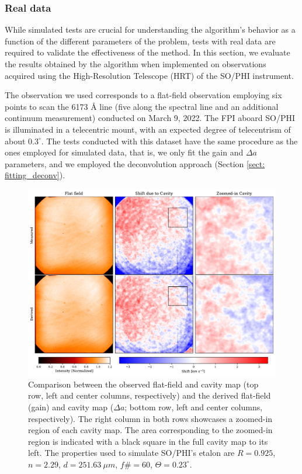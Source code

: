\subsubsection{Real data}

While simulated tests are crucial for understanding the algorithm's behavior as a function of the different parameters of the problem, tests with real data are required to validate the effectiveness of the method. In this section, we evaluate the results obtained by the algorithm when implemented on observations acquired using the High-Resolution Telescope (HRT) of the SO/PHI instrument. 

The observation we used corresponds to a flat-field observation employing six points to scan the 6173 \r{A} line (five along the spectral line and an additional continuum measurement) conducted on March 9, 2022. The FPI aboard SO/PHI is illuminated in a telecentric mount, with an expected degree of telecentrism of about $0.3^\circ$. The tests conducted with this dataset have the same procedure as the ones employed for simulated data, that is, we only fit the gain and $\Delta a$ parameters, and we employed the deconvolution approach (Section \ref{sect: fitting_deconv}).

\begin{figure}[t]
  \includegraphics[width=\textwidth]{figures/EtalonPaper/Comparison_HRT.pdf}
  \caption[Comparison of results and real data.]{Comparison between the observed flat-field and cavity map (top row, left and center columns, respectively) and the derived flat-field (gain) and cavity map ($\Delta a$; bottom row, left and center columns, respectively). The right column in both rows showcases a zoomed-in region of each cavity map. The area corresponding to the zoomed-in region is indicated with a black square in the full cavity map to its left. The properties used to simulate SO/PHI's etalon are $R = 0.925$, $n=2.29$, $d = 251.63\ \mu m$, $f\# = 60$, $\Theta = 0.23 ^{\circ}$.\label{fig_etalon_corr:HRT}}  
\end{figure}

